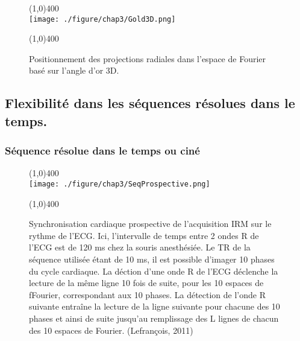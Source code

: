 \begin{figure}[H]
\centering \line(1,0){400} \\
\texttt{[image: ./figure/chap3/Gold3D.png]}
\caption[Angle d'or 3D]{\label{fig:Gold3D} Positionnement des projections radiales dans l'espace de Fourier basé sur l'angle d'or 3D.}
\line(1,0){400} \\ \end{figure}

\subsection{Flexibilité dans les séquences résolues dans le temps.}

\subsubsection{Séquence résolue dans le temps ou ciné}
\begin{figure}[H]
\centering \line(1,0){400} \\
\texttt{[image: ./figure/chap3/SeqProspective.png]}
\caption[Sequence prospective]{\label{fig:SeqProspective} Synchronisation cardiaque prospective de l'acquisition IRM sur le rythme de l'ECG. Ici, l'intervalle de temps entre 2 ondes R de l'ECG est de 120 ms chez la souris anesthésiée. Le TR de la séquence utilisée étant de 10 ms, il est possible d'imager 10 phases du cycle cardiaque. La déction d'une onde R de l'ECG déclenche la lecture de la même ligne 10 fois de suite, pour les 10 espaces de fFourier, correspondant aux 10 phases. La détection de l'onde R suivante entraîne la lecture de la ligne suivante pour chacune des 10 phases et ainsi de suite jusqu'au remplissage des L lignes de chacun des 10 espaces de Fourier. (Lefrançois, 2011)}
\line(1,0){400} \\ \end{figure}

